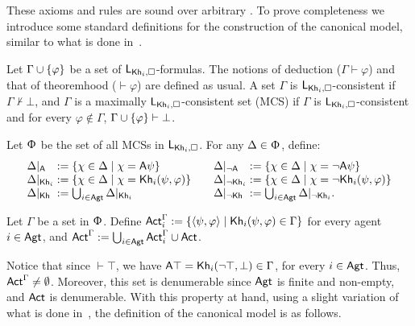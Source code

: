 These axioms and rules are sound over arbitrary \ultss.
To prove completeness we introduce some standard definitions for the construction of the canonical model, similar to what is done in~\cite{AFSVQ21,AFSVQ23report}.

\medskip

\begin{definition}\label{def:notation-completeness}
Let $\Gamma\cup\{ \varphi \}$ be a set of $\mathsf{L}_{{\sf Kh}_i,\square}$-formulas. The notions of deduction ($\Gamma \vdash \varphi$) and that of theoremhood ($\vdash \varphi$) 
are defined as usual. 
A set $\Gamma$ is $\mathsf{L}_{{\sf Kh}_i,\square}$-consistent if $\Gamma \not \vdash \bot$, and 
$\Gamma$ is a maximally $\mathsf{L}_{{\sf Kh}_i,\square}$-consistent set (MCS) if $\Gamma$ is $\mathsf{L}_{{\sf Kh}_i,\square}$-consistent and for every $\varphi \not\in \Gamma $, $\Gamma \cup \{ \varphi \} \vdash \bot$.
\end{definition}

\medskip

\begin{definition}
Let $\Upphi$ be the set of all MCSs in $\mathsf{L}_{{\sf Kh}_i,\square}$.
For any $\Delta \in \Upphi$, define:
\[
\begin{array}{l@{\;:=\;}l@{\quad\quad}l@{\;:=\;}l}
\resta{\Delta}  & \setof{\chi \in \Delta}{\chi = \A\psi} &
\restna{\Delta} & \setof{\chi \in \Delta}{\chi = \lnot \A\psi} \\
\restkhi{\Delta}  & \setof{\chi \in \Delta}{\chi = \khi(\psi,\varphi)} &
\restnkhi{\Delta} & \setof{\chi \in \Delta}{\chi = \lnot \khi(\psi,\varphi)} \\
\restkh{\Delta}   & \bigcup_{i \in \AGT} \restkhi{\Delta} &
\restnkh{\Delta}  & \bigcup_{i \in \AGT} \restnkhi{\Delta}. \\
\end{array}
\]

Let $\Gamma$ be a set in $\Upphi$.
Define ${\rm \sf Act}^\Gamma_i := \{ \langle \psi,\varphi \rangle \mid {\sf Kh}_i(\psi,\varphi) \in \Gamma \}$ for every agent $i \in {\rm \sf Agt}$, and ${\rm \sf Act}^\Gamma := \bigcup_{i \in {\rm \sf Agt}} {\rm \sf Act}^\Gamma_i\cup {\rm \sf Act}$.
\end{definition}

\medskip

Notice that since $\vdash \top$, we have ${\sf A}\top = {\sf Kh}_i(\neg\top,\bot) \in \Gamma$, for every $i \in {\rm \sf Agt}$. Thus, ${\rm \sf Act}^\Gamma \neq \emptyset$. Moreover, this set is denumerable since ${\rm \sf Agt}$ is finite and non-empty, and ${\rm \sf Act}$ is denumerable. 
With this property at hand, using a slight variation of what is done in~\cite{AFSVQ21,AFSVQ23report}, the definition of the canonical model is as follows.

